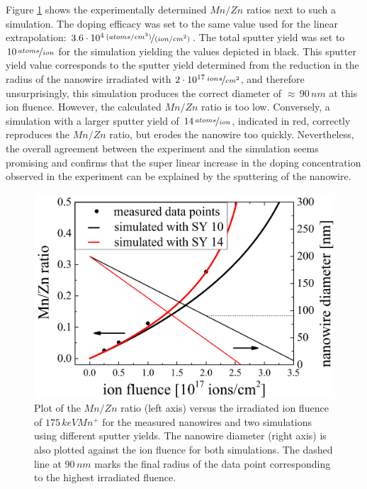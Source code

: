 Figure \ref{staticsputter} shows the experimentally determined $Mn/Zn$ ratios next to such a simulation. The doping efficacy was set to the same value used for the linear extrapolation: $3.6\cdot10^4\,\nicefrac{(atoms/cm^3)}{(ion/cm^2)}$. The total sputter yield was set to $10\,\nicefrac{atoms}{ion}$ for the simulation yielding the values depicted in black. This sputter yield value corresponds to the sputter yield determined from the reduction in the radius of the nanowire irradiated with $2\cdot10^{17}\,\nicefrac{ions}{cm^2}$, and therefore unsurprisingly, this simulation produces the correct diameter of $\approx\,90\,nm$ at this ion fluence. However, the calculated $Mn/Zn$ ratio is too low. Conversely, a simulation with a larger sputter yield of $14\,\nicefrac{atoms}{ion}$, indicated in red, correctly reproduces the $Mn/Zn$ ratio, but erodes the nanowire too quickly. Nevertheless, the overall agreement between the experiment and the simulation seems promising and confirms that the super linear increase in the doping concentration observed in the experiment can be explained by the sputtering of the nanowire.

\begin{figure}[h]
	\centering
		\includegraphics[width=.7\textwidth]{images/staticsputteryield.png}
	\caption{Plot of the $Mn/Zn$ ratio (left axis) versus the irradiated ion fluence of $175\,keV Mn^+$ for the measured nanowires and two simulations using different sputter yields. The nanowire diameter (right axis) is also plotted against the ion fluence for both simulations. The dashed line at $90\,nm$ marks the final radius of the data point corresponding to the highest irradiated fluence.}
	\label{staticsputter}
\end{figure} 


